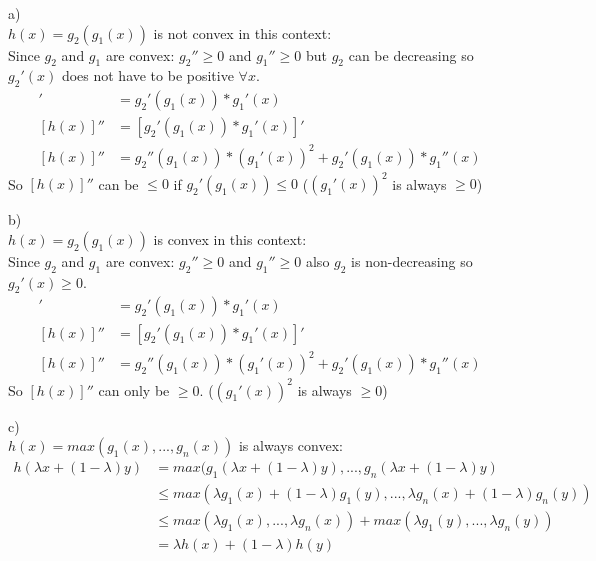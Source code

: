 %
%
%
\begin{flushleft}
a)\\
$h(x)=g_2(g_1(x))$ is not convex in this context:\\
Since $g_2$ and $g_1$ are convex: $g_2''\geq0$ and $g_1''\geq0$ but $g_2$ can 
be decreasing so $g_2'(x)$ does not have to be positive $\forall x$.
\begin{align*}
[h(x)]' &= g_2'(g_1(x))*g_1'(x)\\
[h(x)]'' &= [g_2'(g_1(x))*g_1'(x)]'\\
[h(x)]'' &= g_2''(g_1(x))*(g_1'(x))^2 + g_2'(g_1(x))*g_1''(x)
\end{align*}
So $[h(x)]''$ can be $\leq 0$ if $g_2'(g_1(x)) \leq 0$ ($(g_1'(x))^2$ is 
always $\geq 0$)
\end{flushleft}
\begin{flushleft}
b)\\
$h(x)=g_2(g_1(x))$ is convex in this context:\\
Since $g_2$ and $g_1$ are convex: $g_2''\geq0$ and $g_1''\geq0$ also $g_2$ is 
non-decreasing so $g_2'(x) \geq 0$.
\begin{align*}
[h(x)]' &= g_2'(g_1(x))*g_1'(x)\\
[h(x)]'' &= [g_2'(g_1(x))*g_1'(x)]'\\
[h(x)]'' &= g_2''(g_1(x))*(g_1'(x))^2 + g_2'(g_1(x))*g_1''(x)
\end{align*}
So $[h(x)]''$ can only be $\geq 0$. ($(g_1'(x))^2$ is always $\geq 0$)
\end{flushleft}
\begin{flushleft}
c)\\
$h(x)=max(g_1(x),...,g_n(x))$ is always convex:\\
\begin{align*}
h(\lambda x+ (1- \lambda)y) &= max(g_1(\lambda x+ (1- \lambda)y), ... , 
g_n(\lambda x+ (1- \lambda)y)\\
&\leq max(\lambda g_1(x) + (1-\lambda)g_1(y),...,\lambda g_n(x) + (1-\lambda)g_n(y))\\
&\leq max(\lambda g_1(x), ... , \lambda g_n(x)) + max(\lambda g_1(y), ... , \lambda g_n(y))\\
&= \lambda h(x) + (1-\lambda)h(y)
\end{align*}
\end{flushleft}
%
%
